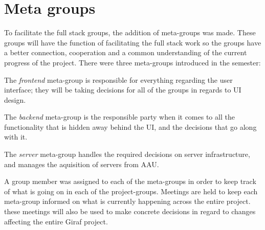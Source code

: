 \section{Meta groups}\label{SUBSEC:MetaGroups}
To facilitate the full stack groups, the addition of meta-groups was made.
These groups will have the function of facilitating the full stack work so the groups have a better connection, cooperation and a common understanding of the current progress of the project.
There were three meta-groups introduced in the semester:

The \textit{frontend} meta-group is responsible for everything regarding the user interface; they will be taking decisions for all of the groups in regards to UI design.

The \textit{backend} meta-group is the responsible party when it comes to all the functionality that is hidden away behind the UI, and the decisions that go along with it.

The \textit{server} meta-group handles the required decisions on server infrastructure, and manages the aquisition of servers from AAU.

A group member was assigned to each of the meta-groups in order to keep track of what is going on in each of the project-groups. 
Meetings are held to keep each meta-group informed on what is currently happening across the entire project. 
these meetings will also be used to make concrete decisions in regard to changes affecting the entire Giraf project.
